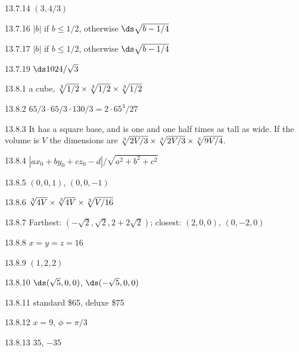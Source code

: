 \begin{Answer}{13.7.14}
$(3,4/3)$
\end{Answer}
\begin{Answer}{13.7.16}
$|b|$ if $b\le1/2$, otherwise $\ds\sqrt{b-1/4}$
\end{Answer}
\begin{Answer}{13.7.17}
$|b|$ if $b\le1/2$, otherwise $\ds\sqrt{b-1/4}$
\end{Answer}
\begin{Answer}{13.7.19}
$\ds 1024/\sqrt3$
\end{Answer}
\begin{Answer}{13.8.1}
a cube, $\root 3 \of {1/2}\times\root 3 \of {1/2}\times\root 3 \of {1/2}$
\end{Answer}
\begin{Answer}{13.8.2}
$65/3\cdot 65/3\cdot 130/3=2\cdot 65^3/27$
\end{Answer}
\begin{Answer}{13.8.3}
It has a square base, and is one and one half times as tall as wide.
If the volume is $V$ the dimensions are $\root 3 \of {2V/3}\times
\root 3 \of {2V/3}\times \root 3\of {9V/4}$.
\end{Answer}
\begin{Answer}{13.8.4}
$|ax_0+by_0+cz_0-d|/\sqrt{a^2+b^2+c^2}$
\end{Answer}
\begin{Answer}{13.8.5}
$(0,0,1)$, $(0,0,-1)$
\end{Answer}
\begin{Answer}{13.8.6}
$\root 3\of{4V}\times\root 3\of{4V}\times\root 3\of{V/16}$
\end{Answer}
\begin{Answer}{13.8.7}
Farthest: $(-\sqrt2,\sqrt2,2+2\sqrt2)$; closest:
$(2,0,0)$, $(0,-2,0)$
\end{Answer}
\begin{Answer}{13.8.8}
$x=y=z=16$
\end{Answer}
\begin{Answer}{13.8.9}
$(1,2,2)$
\end{Answer}
\begin{Answer}{13.8.10}
$\ds (\sqrt{5},0,0)$, $\ds (-\sqrt{5},0,0)$
\end{Answer}
\begin{Answer}{13.8.11}
standard \$65, deluxe \$75
\end{Answer}
\begin{Answer}{13.8.12}
$x=9$, $\phi=\pi/3$
\end{Answer}
\begin{Answer}{13.8.13}
$35$, $-35$
\end{Answer}
